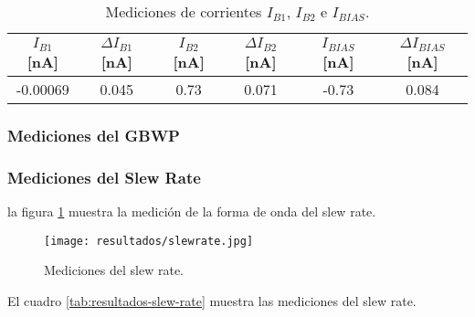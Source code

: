 \begin{table}[h!]
\centering
\begin{tabular}{|c|c|c|c|c|c|}
\hline
$I_{B1}$ [nA] & $\Delta I_{B1}$ [nA] & $I_{B2}$ [nA] & $\Delta I_{B2}$ [nA] & $I_{BIAS}$ [nA] & $\Delta I_{BIAS}$ [nA] \\ \hline
-0.00069 & 0.045 & 0.73 & 0.071 & -0.73 & 0.084 \\ \hline
\end{tabular}
\caption{Mediciones de corrientes $I_{B1}$, $I_{B2}$ e $I_{BIAS}$.}
\label{tab:resultados-corrientes-bias}
\end{table}

\subsubsection{Mediciones del GBWP}

\begin{table}[h!]
\centering
{}
\caption{Mediciones del producto ganancia ancho de banda.}
\label{tab:resultados-gbwp}
\end{table}

\subsubsection{Mediciones del Slew Rate}

la figura \ref{fig:resultados-slew-rate} muestra la medición de la forma de onda del slew rate.

\begin{figure}[h!]
\centering
\texttt{[image: resultados/slewrate.jpg]}
\caption{Mediciones del slew rate.}
\label{fig:resultados-slew-rate}
\end{figure}

El cuadro \ref{tab:resultados-slew-rate} muestra las mediciones del slew rate.

